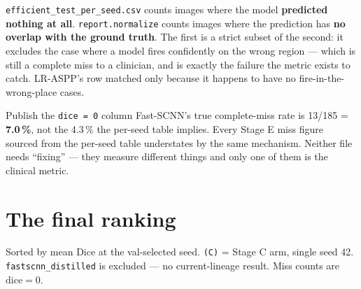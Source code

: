 \documentclass[11pt]{article}
\begin{document}
\texttt{efficient\_test\_per\_seed.csv} counts images where the model
\textbf{predicted nothing at all}. \texttt{report.normalize} counts images where
the prediction has \textbf{no overlap with the ground truth}. The first is a
strict subset of the second: it excludes the case where a model fires confidently
on the wrong region --- which is still a complete miss to a clinician, and is
exactly the failure the metric exists to catch. LR-ASPP's row matched only because
it happens to have no fire-in-the-wrong-place cases.

\begin{keybox}{Publish the \texttt{dice = 0} column}
Fast-SCNN's true complete-miss rate is 13/185 = \textbf{7.0\,\%}, not the 4.3\,\%
the per-seed table implies. Every Stage E miss figure sourced from the per-seed
table understates by the same mechanism. Neither file needs ``fixing'' --- they
measure different things and only one of them is the clinical metric.
\end{keybox}

\section{The final ranking}

Sorted by mean Dice at the val-selected seed. \texttt{(C)} = Stage C arm, single
seed 42. \texttt{fastscnn\_distilled} is excluded --- no current-lineage result.
Miss counts are $\mathrm{dice}=0$.
\end{document}
